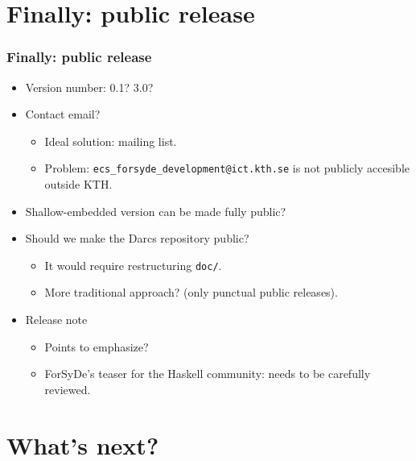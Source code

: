 \documentclass{beamer}
\begin{document}
\section{Finally: public release}

\begin{frame}
  \frametitle{Finally: public release}
 \begin{itemize}
 \item Version number: 0.1? 3.0?
 \item Contact email?
   \begin{itemize}
   \item Ideal solution: mailing list.
   \item Problem: \texttt{ecs\_forsyde\_development@ict.kth.se} is not
     publicly accesible outside KTH.
   \end{itemize}

 \item Shallow-embedded version can be made fully public?
 \item Should we make the Darcs repository public?
   \begin{itemize}
   \item It would require restructuring \texttt{doc/}.
   \item More traditional approach? (only punctual public releases).
   \end{itemize}
 \item Release note
   \begin{itemize}
     \item Points to emphasize?
     \item ForSyDe's teaser for the Haskell community: needs to be
       carefully reviewed.
     \end{itemize}
 \end{itemize}
\end{frame}


\section{What's next?}
\end{document}
